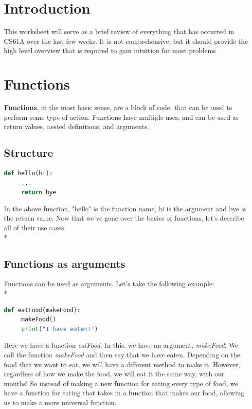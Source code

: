 \documentclass{article}
\begin{document}
\maketitle
\section{Introduction}
This worksheet will serve as a brief review of everything that has occurred in CS61A over the last few weeks. It is not comprehensive, but it should provide the high level overview that is required to gain intuition for most problems
\section{Functions}
\textbf{Functions}, in the most basic sense, are a block of code, that can be used to perform some type of action. Functions have multiple uses, and can be used as return values, nested definitions, and arguments. 

\subsection{Structure}
\begin{lstlisting}[language = Python]
def hello(hi):
     ...
     return bye
\end{lstlisting}
In the above function, "hello" is the function name, hi is the argument and bye is the return value. 
Now that we've gone over the basics of functions, let's describe all of their use cases. \\*
\subsection{Functions as arguments}
Functions can be used as arguments. Let's take the following example: \\*
\bigskip
\begin{lstlisting}[language = Python]
def eatFood(makeFood):
     makeFood()
     print("I have eaten!")
\end{lstlisting}
Here we have a function \emph{eatFood}. In this, we have an argument, \emph{makeFood}. We call the function \emph{makeFood} and then say that we have eaten. Depending on the food that we want to eat, we will have a different method to make it. However, regardless of how we make the food, we will eat it the same way, with our mouths! So instead of making a new function for eating every type of food, we have a function for eating that takes in a function that makes our food, allowing us to make a more universal function. 
\end{document}
